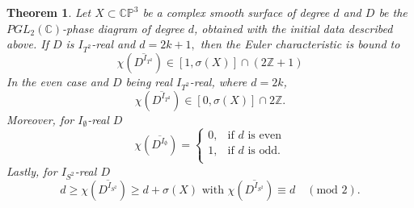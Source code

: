 \documentclass[pdflatex,sn-mathphys-num]{sn-jnl}%
\theoremstyle{thmstyleone}%
\newtheorem{theorem}{Theorem}
\theoremstyle{thmstyletwo}%
\theoremstyle{thmstylethree}%
\newcommand{\C}{\mathbb{C}}
\newcommand{\p}{{\mathbb{P}}}
\begin{document}
\begin{theorem}\label{theorem_ec}
	Let $X\subset\C\p^3$ be a complex smooth surface of degree $d$ and $D$ be the $PGL_2(\mathbb{C})$-phase diagram of degree $d$, obtained with the initial data described above. If $D$ is ${I_{T^2}}$-real and $d=2k+1,$ then the Euler characteristic is bound to
	$$\chi(\overline{D^{I_{T^2}}})\in[1,\sigma(X)]\cap (2\mathbb{Z}+1)$$
	In the even case and $D$ being real ${I_{T^2}}$-real, where $d=2k$,
	$$\chi(\overline{D^{I_{T^2}}})\in[0,\sigma(X)]\cap 2\mathbb{Z}.$$
	Moreover, for $I_\emptyset$-real $D$ \[  \chi(\overline{D^{I_{\emptyset}}})=\left\{
	\begin{array}{ll}
		0, & \text{if } d \text{ is even} \\
		1, & \text{if } d \text{ is odd.} \\
	\end{array} 
	\right. \]
	Lastly, for $I_{S^2}$-real $D$ $$d\geq\chi(\overline{D^{I_{S^2}}})\geq d+\sigma(X)\text{ with }\chi(\overline{D^{I_{S^2}}})\equiv d \quad (\text{mod 2}).$$
\end{theorem}
\end{document}
